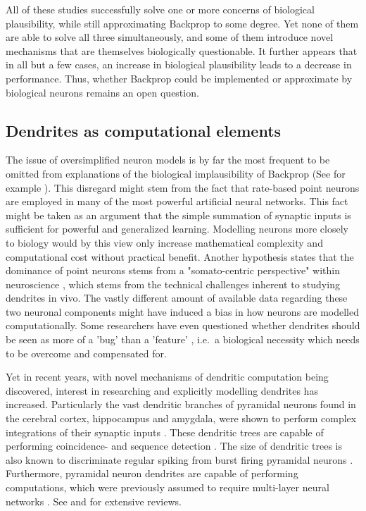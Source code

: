 \noindent All of these studies successfully solve one or more concerns of biological plausibility, while still
approximating Backprop to some degree. Yet none of them are able to solve all three simultaneously, and some of them
introduce novel mechanisms that are themselves biologically questionable. It further appears that in all but a few
cases, an increase in biological plausibility leads to a decrease in performance. Thus, whether Backprop could be
implemented or approximate by biological neurons remains an open question.

\subsection{Dendrites as computational elements}\label{sec-dendrites}

The issue of oversimplified neuron models is by far the most frequent to be omitted from explanations of the biological
implausibility of Backprop (See for example \citep{Meulemans2020,Lillicrap2014}). This disregard might stem from the
fact that rate-based point neurons are employed in many of the most powerful artificial neural networks. This fact might
be taken as an argument that the simple summation of synaptic inputs is sufficient for powerful and generalized
learning. Modelling neurons more closely to biology would by this view only increase mathematical complexity and
computational cost without practical benefit. Another hypothesis states that the dominance of point neurons stems from a
"somato-centric perspective" within neuroscience \citep{Larkum2018}, which stems from the technical challenges inherent
to studying dendrites in vivo. The vastly different amount of available data regarding these two neuronal components
might have induced a bias in how neurons are modelled computationally. Some researchers have even questioned whether
dendrites should be seen as more of a 'bug' than a 'feature' \citep{Haeusser2003}, i.e.\ a biological necessity which
needs to be overcome and compensated for.

Yet in recent years, with novel mechanisms of dendritic computation being discovered, interest in researching and
explicitly modelling dendrites has increased. Particularly the vast dendritic branches of pyramidal neurons found in the
cerebral cortex, hippocampus and amygdala, were shown to perform complex integrations of their synaptic inputs
\citep{spruston2008pyramidal}. These dendritic trees are capable of performing coincidence- \citep{Larkum1999} and
sequence detection \citep{Branco2010}. The size of dendritic trees is also known to discriminate regular spiking from
burst firing pyramidal neurons \citep{Elburg2010}. Furthermore, pyramidal neuron dendrites are capable of performing
computations, which were previously assumed to require multi-layer neural networks \citep{Schiess2016,Gidon2020}. See
\citep{Larkum2022} and \citep{Poirazi2020} for extensive reviews.

